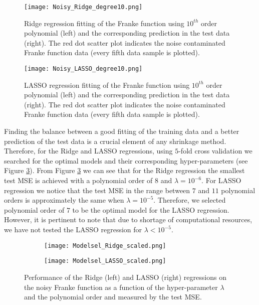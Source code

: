 \documentclass[a4paper]{article}
\begin{document}
\begin{figure}[H]
  \centering
  \texttt{[image: Noisy\_Ridge\_degree10.png]}
  \caption{Ridge regression fitting of the Franke function using $10^{th}$ order polynomial (left) and the corresponding prediction in the test data (right). The red dot scatter plot indicates the noise contaminated Franke function data (every fifth data sample is plotted).}
    \label{Noisy_Ridge_degree10}
\end{figure}
\begin{figure}
  \centering
  \texttt{[image: Noisy\_LASSO\_degree10.png]}
  \caption{LASSO regression fitting of the Franke function using $10^{th}$ order polynomial (left) and the corresponding prediction in the test data (right). The red dot scatter plot indicates the noise contaminated Franke function data (every fifth data sample is plotted).}
    \label{Noisy_LASSO_degree10}
\end{figure}

Finding the balance between a good fitting of the training data and a better prediction of the test data is a crucial element of any shrinkage method. Therefore, for the Ridge and LASSO regressions, using $5$-fold cross validation we searched for the optimal models and their corresponding hyper-parameters (see Figure \ref{Bias_varienceRidge_LASSO_lambda}). From Figure \ref{Bias_varienceRidge_LASSO_lambda} we can see that for the Ridge regression the smallest test MSE is achieved with a polynomial order of $8$ and $\lambda=10^{-6}$. For LASSO regression we notice that the test MSE in the range between $7$ and $11$ polynomial orders is approximately the same when $\lambda=10^{-5}$. Therefore, we selected polynomial order of $7$ to be the optimal model for the LASSO regression. However, it is pertinent to note that due to shortage of computational resources, we have not tested the LASSO regression for $\lambda < 10^{-5}$.

\begin{figure}[ht]
     \centering
     \begin{subfigure}{.475\textwidth}
         \centering
         \texttt{[image: Modelsel\_Ridge\_scaled.png]}
     \end{subfigure}
     \begin{subfigure}{.475\textwidth}
         \centering
         \texttt{[image: Modelsel\_LASSO\_scaled.png]}
     \end{subfigure}
    \caption{Performance of the Ridge (left) and LASSO (right) regressions on the noisy Franke function as a function of the hyper-parameter $\lambda$ and the polynomial order and measured by the test MSE. }
    \label{Bias_varienceRidge_LASSO_lambda}
\end{figure}
\end{document}
